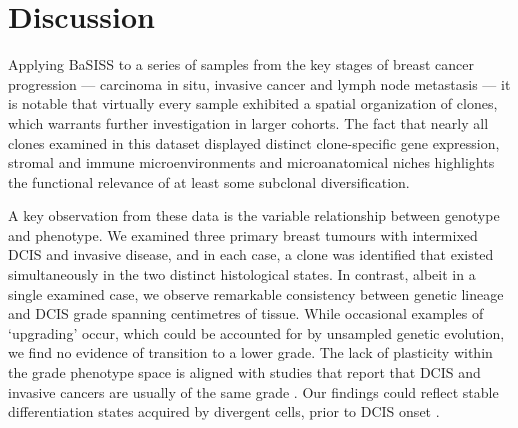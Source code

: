 \section{Discussion}

Applying \ac{BaSISS} to a series of samples from the key stages of breast cancer progression — carcinoma in situ, invasive cancer and lymph node metastasis — it is notable that virtually every sample exhibited a spatial organization of clones, which warrants further investigation in larger cohorts. The fact that nearly all clones examined in this dataset displayed distinct clone-specific gene expression, stromal and immune microenvironments and microanatomical niches highlights the functional relevance of at least some subclonal diversification.

A key observation from these data is the variable relationship between genotype and phenotype. We examined three primary breast tumours with intermixed \ac{DCIS} and invasive disease, and in each case, a clone was identified that existed simultaneously in the two distinct histological states. In contrast, albeit in a single examined case, we observe remarkable consistency between genetic lineage and \ac{DCIS} grade spanning centimetres of tissue. While occasional examples of `upgrading' occur, which could be accounted for by unsampled genetic evolution, we find no evidence of transition to a lower grade. The lack of plasticity within the grade phenotype space is aligned with studies that report that \ac{DCIS} and invasive cancers are usually of the same grade \parencite{Gupta1997-om,Van_Luijt2016-vq}. Our findings could reflect stable differentiation states acquired by divergent cells, prior to \ac{DCIS} onset \parencite{Rakha2022-qm}.

